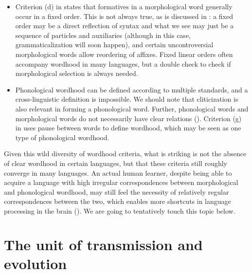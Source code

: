 \documentclass[a4paper, oneside, scheme=plain, 12pt]{article}
\newcommand*{\citepage}[1]{p.~{#1}}
\begin{document}
\begin{itemize}
    \item Criterion (d) in \citet[\citepage{14}]{dixon2010basic2} states that formatives in a morphological word generally occur in a fixed order.
    This is not always true, as is discussed in :
    a fixed order may be a direct reflection of syntax
    and what we see may just be a sequence of particles and auxiliaries
    (although in this case, grammaticalization will soon happen),
    and certain uncontroversial morphological words allow reordering of affixes.
    Fixed linear orders often accompany wordhood in many languages,
    but a double check to check if morphological selection is always needed.

    \item Phonological wordhood can be defined according to multiple standards,
    and a cross-linguistic definition is impossible.
    We should note that cliticization is also relevant in forming a phonological word.
    Further, phonological words and morphological words do not necessarily have clear relations
    ().
    Criterion (g) in \citet[\citepage{18}]{dixon2010basic2} uses pause between words to define  wordhood, which may be seen as one type of phonological wordhood.
\end{itemize}

Given this wild diversity of wordhood criteria,
what is striking is not the absence of clear wordhood in certain languages,
but that these criteria still roughly converge in many languages.
An actual human learner, despite being able to acquire a language with high irregular correspondences between morphological and phonological wordhood,
may still feel the necessity of relatively regular correspondences between the two,
which enables more shortcuts in language processing in the brain ().
We are going to tentatively touch this topic below.

\section{The unit of transmission and evolution}
\end{document}
